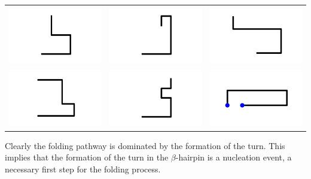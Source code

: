  {
  \begin{tabular}{ c c c }
    \includegraphics[width=.252\linewidth]{supplement/beta_cluster_example_2/pictures/18/state_cluster_shapes_0.pdf} &
    \includegraphics[width=.252\linewidth]{supplement/beta_cluster_example_2/pictures/18/state_cluster_shapes_1.pdf} & 
    \includegraphics[width=.252\linewidth]{supplement/beta_cluster_example_2/pictures/18/state_cluster_shapes_2.pdf} \\
    \includegraphics[width=.252\linewidth]{supplement/beta_cluster_example_2/pictures/18/state_cluster_shapes_3.pdf} &
    \includegraphics[width=.252\linewidth]{supplement/beta_cluster_example_2/pictures/18/state_cluster_shapes_4.pdf} &
    \includegraphics[width=.252\linewidth]{supplement/beta_cluster_example_2/pictures/18/state_cluster_shapes_5.pdf} 
  \end{tabular}
}
%
Clearly the folding pathway is dominated by the formation of the turn. This implies that the formation of the turn in the $\beta$-hairpin is a nucleation event, a necessary first step for the folding process. 

